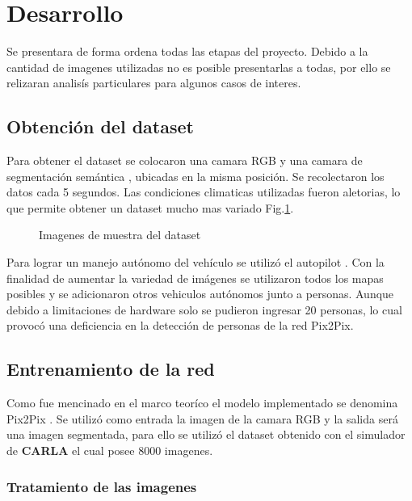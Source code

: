 \documentclass[]{IEEEtran}
\begin{document}
    \section{Desarrollo}

    Se presentara de forma ordena todas las etapas del proyecto. 
    Debido a la cantidad de imagenes utilizadas no es posible presentarlas a todas, por ello 
    se relizaran analisís particulares para algunos casos de interes.

    \subsection{Obtención del dataset}

    Para obtener el dataset se colocaron una camara RGB y una camara de segmentación semántica
    \cite{CARLA-Sensors-Reference}, ubicadas en la misma posición. Se recolectaron los datos 
    cada 5 segundos. Las condiciones climaticas utilizadas fueron aletorias, lo que permite 
    obtener un dataset mucho mas variado Fig.\ref{fig:dataset}.

    \begin{figure}
        \centering
        \caption{Imagenes de muestra del dataset}
        \label{fig:dataset}
    \end{figure}

    Para lograr un manejo autónomo del vehículo se utilizó el autopilot \cite{CARLA-Documentation}. 
    Con la finalidad de aumentar la variedad de imágenes se utilizaron todos los mapas posibles y 
    se adicionaron otros vehiculos autónomos junto a personas. Aunque debido 
    a limitaciones de hardware solo se pudieron ingresar 20 personas, lo cual 
    provocó una deficiencia en la detección de personas de la red Pix2Pix. 

    \subsection{Entrenamiento de la red}

    Como fue mencinado en el marco teoríco el modelo implementado se denomina Pix2Pix \cite{Pix2Pix}.
    Se utilizó como entrada la imagen de la camara RGB y la salida será una imagen segmentada, para ello se utilizó
    el dataset obtenido con el simulador de \textbf{CARLA} el cual posee 8000 imagenes. 

    \subsubsection{Tratamiento de las imagenes}
\end{document}
